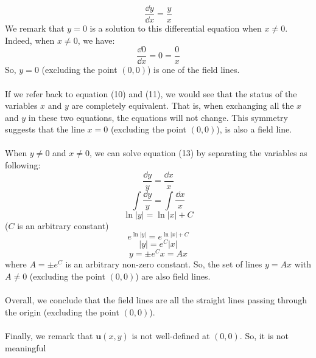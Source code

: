 \documentclass{article}
\begin{document}
\begin{enumerate}
\begin{enumerate}
\begin{equation}
  \end{equation}
  \begin{equation}
    \frac{\dd y}{\dd x} = \frac{y}{x}
  \end{equation}
  We remark that \(y=0\) is a solution to this differential equation when \(x\ne 0\). Indeed, when \(x\ne 0\), we have:
  \begin{equation}
    \frac{\dd 0}{\dd x} = 0 = \frac{0}{x}
  \end{equation}
  So, \(y=0\) (excluding the point \((0,0)\)) is one of the field lines. \\
  \\
  If we refer back to equation (10) and (11), we would see that the status of the variables \(x\) and \(y\)
  are completely equivalent. That is, when exchanging all the \(x\) and \(y\) in these two equations, the equations will
  not change. This symmetry suggests that the line \(x=0\) (excluding the point \((0,0)\)), is also a field line. \\
  \\
  When \(y\ne 0\) and \(x\ne 0\), we can solve equation (13) by separating the variables as following:
  \begin{equation}
    \frac{\dd y}{y} = \frac{\dd x}{x}
  \end{equation}
  \begin{equation}
    \int \frac{\dd y}{y} = \int \frac{\dd x}{x}
  \end{equation}
  \begin{equation}
    \ln|y| = \ln|x|+C
  \end{equation}
  (\(C\) is an arbitrary constant)
  \begin{equation}
    e^{\ln|y|} = e^{\ln|x|+C}
  \end{equation}
  \begin{equation}
    |y| = e^C |x|
  \end{equation}
  \begin{equation}
    y = \pm e^C x = Ax
  \end{equation}
  where \(A= \pm e^C\) is an arbitrary non-zero constant. So, the set of lines \(y=Ax\) with \(A\ne 0\) (excluding the point \((0,0)\))
  are also field lines. \\
  \\
  Overall, we conclude that the field lines are all the straight lines passing through the origin (excluding the point \((0,0)\)).\\
  \\
  Finally, we remark that \(\mathbf{u}(x,y)\) is not well-defined at \((0,0)\). So, it is not meaningful

\end{enumerate}
\end{enumerate}
\end{document}
